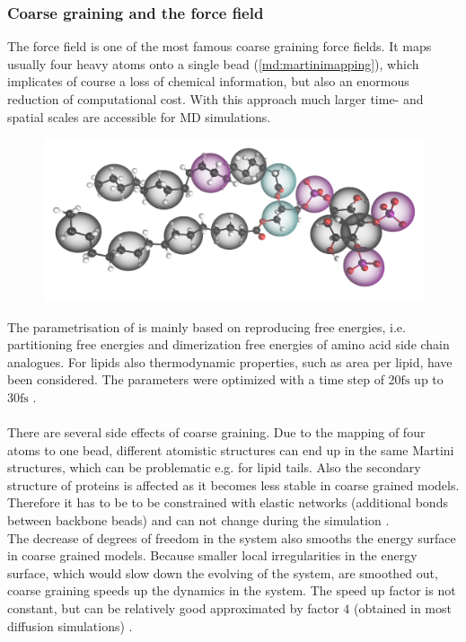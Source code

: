 \subsubsection{Coarse graining and the \martini{} force field}
\label{subsub:coarsegraining}
The \martini{} force field \autocites{martini}{martini22}{martini22_lipids} is one of the most famous coarse graining force fields. It maps usually four heavy atoms onto a single bead (\autoref{md:martinimapping}), which implicates of course a loss of chemical information, but also an enormous reduction of computational cost. With this approach much larger time- and spatial scales are accessible for MD simulations.\\
%
%
%
\begin{figure}
	\centering
	\includegraphics[width=.5\textwidth]{figures/introduction/fig_martini_mapping}
	\label{md:martinimapping}
\end{figure}
%
%
%
The parametrisation of \martini{} is mainly based on reproducing free energies, i.e. partitioning free energies and dimerization free energies of amino acid side chain analogues. For lipids also thermodynamic properties, such as area per lipid, have been considered. The parameters were optimized with a time step of 20$\si{\femto\second}$ up to 30$\si{\femto\second}$ \autocites{martini22}{martini22_lipids}.\\
\\
There are several side effects of coarse graining. Due to the mapping of four atoms to one bead, different atomistic structures can end up in the same Martini structures, which can be problematic e.g. for lipid tails. Also the secondary structure of proteins is affected as it becomes less stable in coarse grained models. Therefore it has to be to be constrained with elastic networks (additional bonds between backbone beads) and can not change during the simulation \autocite[p. 6812]{martini22_check}.\\
The decrease of degrees of freedom in the system also smooths the energy surface in coarse grained models. Because smaller local irregularities in the energy surface, which would slow down the evolving of the system, are smoothed out, coarse graining speeds up the dynamics in the system. The speed up factor is not constant, but can be relatively good approximated by factor $4$ (obtained in most diffusion simulations) \autocites[p. 6810]{martini22_check}[p. 7815]{martini}.\\
